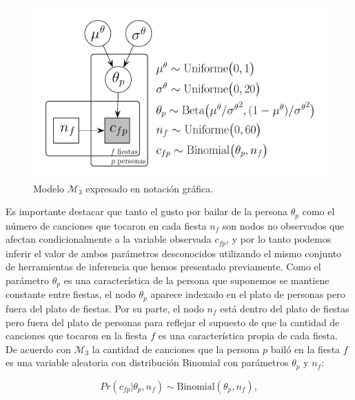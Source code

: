 \documentclass{article}
\begin{document}
\begin{figure}[H]
\centerline{\includegraphics[width=1\textwidth]{m_3.pdf}}
\caption{Modelo $\mathcal M_3$ expresado en notación gráfica.}
\label{fig:m_3}
\end{figure}

\indent Es importante destacar que tanto el gusto por bailar de la persona $\theta_p$ como el número de canciones que tocaron en cada fiesta $n_f$ son nodos no observados que afectan condicionalmente a la variable observada $c_{fp}$, y por lo tanto podemos inferir el valor de ambos parámetros desconocidos utilizando el mismo conjunto de herramientas de inferencia que hemos presentado previamente. Como el parámetro $\theta_p$ es una característica de la persona que suponemos se mantiene constante entre fiestas, el nodo $\theta_p$ aparece indexado en el plato de personas pero fuera del plato de fiestas. Por su parte, el nodo $n_f$ está dentro del plato de fiestas pero fuera del plato de personas para reflejar el supuesto de que la cantidad de canciones que tocaron en la fiesta $f$ es una característica propia de cada fiesta.\\
\indent De acuerdo con $\mathcal M_3$ la cantidad de canciones que la persona $p$ bailó en la fiesta $f$ es una variable aleatoria con distribución Binomial con parámetros $\theta_p$ y $n_f$:

\begin{equation}
Pr(c_{fp}|\theta_p,n_f)\sim \mathrm{Binomial}(\theta_p,n_f)\label{M3_1},
\end{equation}
\end{document}
